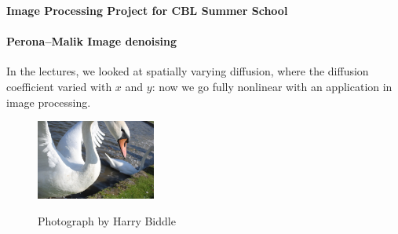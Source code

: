 \documentclass[12pt,a4paper]{article}
\begin{document}
\pagestyle{empty}

\begin{center}
  \begin{Large}
    \bf Image Processing Project for CBL Summer School
  \end{Large}

\end{center}





\paragraph{Perona--Malik Image denoising} 
In the lectures, we looked at spatially varying diffusion, where the diffusion coefficient varied with $x$ and $y$: now we go fully nonlinear with an application in image processing.

\begin{figure}
  \hfill\includegraphics[width=0.35\textwidth]{swan-512}\\

  \vspace*{-3.5ex}

  {\scriptsize \hspace*{2em}
      Photograph by Harry Biddle}

  \label{fig:bunny}
\end{figure}
\end{document}
